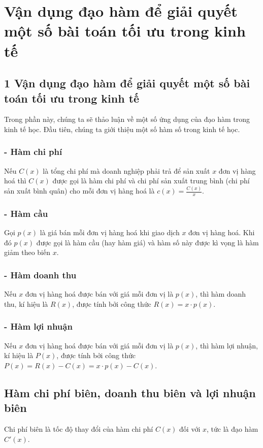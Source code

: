 \section*{Vận dụng đạo hàm để giải quyết một số bài toán tối ưu trong kinh tế}

	\subsection*{1 Vận dụng đạo hàm để giải quyết một số bài toán tối ưu trong kinh tế}
	Trong phần này, chúng ta sẽ thảo luận về một số ứng dụng của đạo hàm trong kinh tế học. Đầu tiên, chúng ta giới thiệu một số hàm số trong kinh tế học.

		\subsubsection*{- Hàm chi phí}
		Nếu $C(x)$ là tổng chi phí mà doanh nghiệp phải trả để sản xuất $x$ đơn vị hàng hoá thì $C(x)$ được gọi là hàm chi phí và chi phí sản xuất trung bình (chi phí sản xuất bình quân) cho mỗi đơn vị hàng hoá là $c(x) = \frac{C(x)}{x}$.

		\subsubsection*{- Hàm cầu}
		Gọi $p(x)$ là giá bán mỗi đơn vị hàng hoá khi giao dịch $x$ đơn vị hàng hoá. Khi đó $p(x)$ được gọi là hàm cầu (hay hàm giá) và hàm số này được kì vọng là hàm giảm theo biến $x$.

		\subsubsection*{- Hàm doanh thu}
		Nếu $x$ đơn vị hàng hoá được bán với giá mỗi đơn vị là $p(x)$, thì hàm doanh thu, kí hiệu là $R(x)$, được tính bởi công thức
		$R(x) = x \cdot p(x)$.

		\subsubsection*{- Hàm lợi nhuận}
		Nếu $x$ đơn vị hàng hoá được bán với giá mỗi đơn vị là $p(x)$, thì hàm lợi nhuận, kí hiệu là $P(x)$, được tính bởi công thức
		$P(x) = R(x) - C(x) = x \cdot p(x) - C(x)$.

	\subsection*{Hàm chi phí biên, doanh thu biên và lợi nhuận biên}
	Chi phí biên là tốc độ thay đổi của hàm chi phí $C(x)$ đối với $x$, tức là đạo hàm $C'(x)$.

